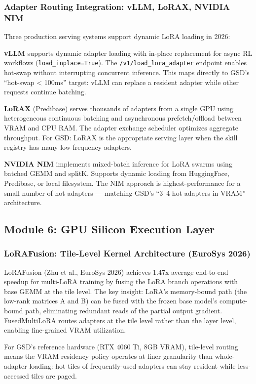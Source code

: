 \documentclass[11pt,letterpaper]{article}
\begin{document}
\subsubsection{Adapter Routing Integration: vLLM, LoRAX, NVIDIA NIM}

Three production serving systems support dynamic LoRA loading in 2026:

\textbf{vLLM} supports dynamic adapter loading with in-place replacement for async RL workflows (\texttt{load\_inplace=True}). The \texttt{/v1/load\_lora\_adapter} endpoint enables hot-swap without interrupting concurrent inference. This maps directly to GSD's ``hot-swap < 100ms'' target: vLLM can replace a resident adapter while other requests continue batching.

\textbf{LoRAX} (Predibase) serves thousands of adapters from a single GPU using heterogeneous continuous batching and asynchronous prefetch/offload between VRAM and CPU RAM. The adapter exchange scheduler optimizes aggregate throughput. For GSD: LoRAX is the appropriate serving layer when the skill registry has many low-frequency adapters.

\textbf{NVIDIA NIM} implements mixed-batch inference for LoRA swarms using batched GEMM and splitK. Supports dynamic loading from HuggingFace, Predibase, or local filesystem. The NIM approach is highest-performance for a small number of hot adapters --- matching GSD's ``3--4 hot adapters in VRAM'' architecture.

\subsection{Module 6: GPU Silicon Execution Layer}

\subsubsection{LoRAFusion: Tile-Level Kernel Architecture (EuroSys 2026)}

LoRAFusion (Zhu et al., EuroSys 2026) achieves 1.47x average end-to-end speedup for multi-LoRA training by fusing the LoRA branch operations with base GEMM at the tile level. The key insight: LoRA's memory-bound path (the low-rank matrices A and B) can be fused with the frozen base model's compute-bound path, eliminating redundant reads of the partial output gradient. FusedMultiLoRA routes adapters at the tile level rather than the layer level, enabling fine-grained VRAM utilization.

For GSD's reference hardware (RTX 4060 Ti, 8GB VRAM), tile-level routing means the VRAM residency policy operates at finer granularity than whole-adapter loading: hot tiles of frequently-used adapters can stay resident while less-accessed tiles are paged.
\end{document}
